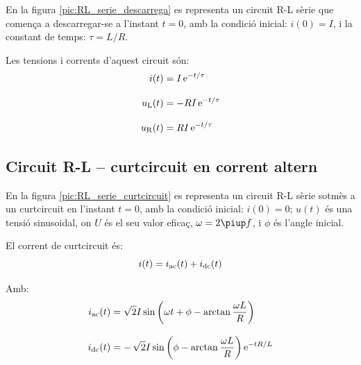 En la figura \vref{pic:RL_serie_descarrega} es representa un circuit R-L s\`{e}rie que comen\c{c}a a descarregar-se a l'instant $t=0$, amb la condici\'{o} inicial: $i(0) = I$, i la constant de temps: $\tau = L/R$.
\begin{center}
    
    \label{pic:RL_serie_descarrega}
\end{center}

Les tensions i corrents d'aquest circuit s\'{o}n:
\begin{align}
    i(t) &= I\,\mathrm{e}^{-t/\tau} \\[3mm]
    u_\mathrm{L}(t) &= - R I\,\mathrm{e}^{-t/\tau} \\[3mm]
    u_\mathrm{R}(t) &= R I\,\mathrm{e}^{-t/\tau}
\end{align}

\subsection{Circuit R-L -- curtcircuit en corrent altern}

En la figura \vref{pic:RL_serie_curtcircuit} es representa un circuit R-L s\`{e}rie sotm\`{e}s a un curtcircuit en l'instant $t=0$, amb la condici\'{o} inicial: $i(0) = 0$; $u(t)$ \'{e}s una tensi\'{o} sinusoidal, on $U$ \'{e}s el seu valor efica\c{c}, $\omega = 2 \piup f$, i $\phi$ \'{e}s l'angle inicial.
\begin{center}
    
    \label{pic:RL_serie_curtcircuit}
\end{center}

El corrent de curtcircuit \'{e}s:
\begin{equation}
    i(t) = i_\mathrm{ac}(t) + i_\mathrm{dc}(t)
    \label{eq:RL_serie_curtcircuit_icc}
\end{equation}

Amb:
\begin{subequations}
\begin{align}
    i_\mathrm{ac}(t) &= \sqrt{2} I \sin\left(\omega t + \phi - \arctan\frac{\omega L}{R}\right) \label{eq:RL_serie_curtcircuit_iac}\\[3mm]
    i_\mathrm{dc}(t) &= -\,\sqrt{2} I\sin\left(\phi - \arctan\frac{\omega L}{R}\right) \mathrm{e}^{-t R/L}\label{eq:RL_serie_curtcircuit_idc}
\end{align}
\end{subequations}

